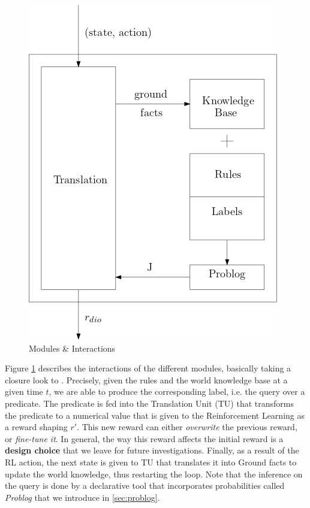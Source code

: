 \begin{figure}[H]
  \centering
  \includegraphics[scale=0.55]{figures/dynamics.png}
  \caption{Modules \& Interactions}
  \label{fig:mods}
\end{figure}

Figure \ref{fig:mods} describes the interactions of the different modules, basically taking a closure look to \dio. Precisely, 
given the rules and the world knowledge base at a given time $t$, we are able 
to produce the corresponding label, i.e. the query over a predicate. The predicate is fed 
into the Translation Unit (TU) that transforms the predicate to a numerical value that is given to the Reinforcement Learning 
as a reward shaping $r'$. This new reward can either \emph{overwrite} the previous reward, or \emph{fine-tune it}. In general, 
the way this reward affects the initial reward is a \textbf{design choice} that we leave for future investigations. 
Finally, as a result of the RL action, the next state is given 
to TU that translates it into Ground facts to update the world
knowledge, thus restarting the loop. Note that the inference on the query is done by a declarative tool that incorporates 
probabilities called \emph{Problog} that we introduce in \ref{sec:problog}.


